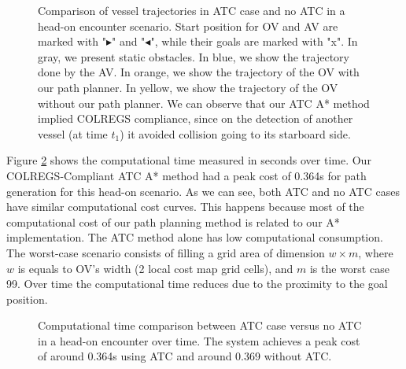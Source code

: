         \begin{figure}
            \centering
            
            \caption{Comparison of vessel trajectories in \ac{ATC} case and no \ac{ATC} in a head-on encounter scenario. Start position for \ac{OV} and \ac{AV} are marked with "$\blacktriangleright$" and "$\blacktriangleleft$", while their goals are marked with "x". In gray, we present static obstacles. In blue, we show the trajectory done by the \ac{AV}. In orange, we show the trajectory of the \ac{OV} with our path planner. In yellow, we show the trajectory of the \ac{OV} without our path planner. We can observe that our \ac{ATC} A* method implied \ac{COLREGS} compliance, since on the detection of another vessel (at time $t_1$) it avoided collision going to its starboard side.}
            \label{fig:plot_ho_w_vs_wo}
        \end{figure}
        
        Figure \ref{fig:plot_ho_w_vs_wo_CT} shows the computational time measured in seconds over time. Our \ac{COLREGS}-Compliant \ac{ATC} A* method had a peak cost of 0.364s for path generation for this head-on scenario. As we can see, both \ac{ATC} and no \ac{ATC} cases have similar computational cost curves. This happens because most of the computational cost of our path planning method is related to our A* implementation. The \ac{ATC} method alone has low computational consumption. The worst-case scenario consists of filling a grid area of dimension $w \times m$, where $w$ is equals to \ac{OV}'s width (2 local cost map grid cells), and $m$ is the worst case 99. Over time the computational time reduces due to the proximity to the goal position.
        
        \begin{figure}[H]
            \centering
            
            \caption{Computational time comparison between \ac{ATC} case versus no \ac{ATC} in a head-on encounter over time. The system achieves a peak cost of around 0.364s using \ac{ATC} and around 0.369 without \ac{ATC}.}
            \label{fig:plot_ho_w_vs_wo_CT}
        \end{figure}
        
